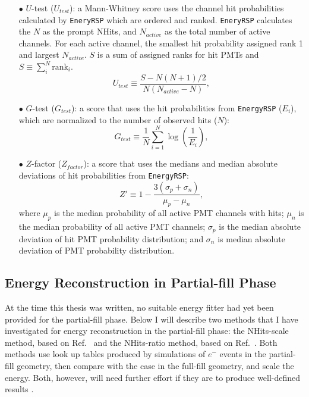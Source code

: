 \begin{itemize}
	\item[$\bullet$]$U$-test ($U_{test}$):
	a Mann-Whitney score uses the channel hit probabilities calculated by \texttt{EneryRSP} which are ordered and ranked. \texttt{EneryRSP} calculates the $N$ as the prompt NHits, and $N_{active}$ as the total number of active channels. For each active channel, the smallest hit probability assigned rank 1 and largest $N_{active}$. $S$ is a sum of assigned ranks for hit PMTs and $S\equiv \sum_{i}^N \mathrm{rank}_i$.
	\begin{equation}
	U_{test}\equiv \frac{S-N(N+1)/2}{N(N_{active}-N)},
	\end{equation}

	\item[$\bullet$] $G$-test ($G_{test}$):
 	a score that uses the hit probabilities from \texttt{EnergyRSP} ($E_i$), which are normalized to the number of observed hits ($N$):
	\begin{equation}
	G_{test}\equiv \frac{1}{N}\sum_{i=1}^N \log(\frac{1}{E_i}),
	\end{equation}
	
	\item[$\bullet$] $Z$-factor ($Z_{factor}$):
	a score that uses the medians and median absolute deviations of hit probabilities from \texttt{EnergyRSP}:
	\begin{equation}
     Z'\equiv 1-\frac{3(\sigma_p+\sigma_n)}{\mu_p-\mu_n},
    \end{equation}
    where $\mu_p$ is the median probability of all active PMT channels with hits; $\mu_n$ is the median probability of all active PMT channels; $\sigma_p$ is the median absolute deviation of hit PMT probability distribution; and
    $\sigma_n$ is median absolute deviation of PMT probability distribution.
\end{itemize}

\subsection{Energy Reconstruction in Partial-fill Phase}

At the time this thesis was written, no suitable energy fitter had yet been provided for the partial-fill phase. Below I will describe two methods that I have investigated for energy reconstruction in the partial-fill phase: the NHits-scale method, based on Ref.~\cite{partialEnergy} and the NHits-ratio method, based on Ref.~\cite{partialEnergyYang}. Both methods use look up tables produced by simulations of $e^-$ events in the partial-fill geometry, then compare with the case in the full-fill geometry, and scale the energy. Both, however, will need further effort if they are to produce well-defined results \cite{jiePartialEnergy,jiePartialEnergyNhitRatio}.

